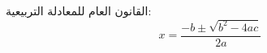 ﻿\documentclass{article}
\begin{document}
القانون العام للمعادلة التربيعية:
\[ x = \frac{-b \pm \sqrt{b^2 - 4ac}}{2a} \]
\end{document}
